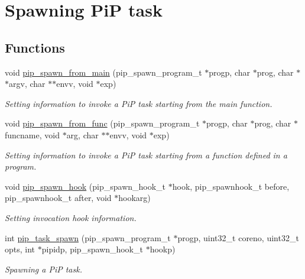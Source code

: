 \hypertarget{group__pip-1-spawn}{\section{Spawning Pi\-P task}
\label{group__pip-1-spawn}
}
\subsection*{Functions}
\begin{DoxyCompactItemize}
\item 
void \hyperlink{group__pip-1-spawn_ga0b1e746befd27c418355d28a830b2db6}{pip\-\_\-spawn\-\_\-from\-\_\-main} (pip\-\_\-spawn\-\_\-program\-\_\-t $\ast$progp, char $\ast$prog, char $\ast$$\ast$argv, char $\ast$$\ast$envv, void $\ast$exp)
\begin{DoxyCompactList}\small\item\em Setting information to invoke a Pi\-P task starting from the main function. \end{DoxyCompactList}\item 
void \hyperlink{group__pip-1-spawn_ga6ebadd5070ca345daf8d7465f4926fc0}{pip\-\_\-spawn\-\_\-from\-\_\-func} (pip\-\_\-spawn\-\_\-program\-\_\-t $\ast$progp, char $\ast$prog, char $\ast$funcname, void $\ast$arg, char $\ast$$\ast$envv, void $\ast$exp)
\begin{DoxyCompactList}\small\item\em Setting information to invoke a Pi\-P task starting from a function defined in a program. \end{DoxyCompactList}\item 
void \hyperlink{group__pip-1-spawn_ga1c3f1d9e029f68dbcfb7d78b7dfa1533}{pip\-\_\-spawn\-\_\-hook} (pip\-\_\-spawn\-\_\-hook\-\_\-t $\ast$hook, pip\-\_\-spawnhook\-\_\-t before, pip\-\_\-spawnhook\-\_\-t after, void $\ast$hookarg)
\begin{DoxyCompactList}\small\item\em Setting invocation hook information. \end{DoxyCompactList}\item 
int \hyperlink{group__pip-1-spawn_gaf1fcc4cb85ec3eda734afe2beb0c6a36}{pip\-\_\-task\-\_\-spawn} (pip\-\_\-spawn\-\_\-program\-\_\-t $\ast$progp, uint32\-\_\-t coreno, uint32\-\_\-t opts, int $\ast$pipidp, pip\-\_\-spawn\-\_\-hook\-\_\-t $\ast$hookp)
\begin{DoxyCompactList}\small\item\em Spawning a Pi\-P task. \end{DoxyCompactList}\item 
$$
\end{DoxyCompactItemize}
